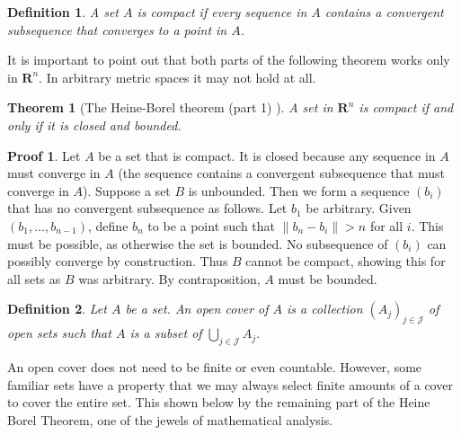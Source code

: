 \documentclass[12pt]{amsbook}
\theoremstyle{plain}
\newtheorem{definition}{Definition}
\newtheorem{theorem}{Theorem}
\theoremstyle{definition}
\newtheorem*{prf}{Proof}
\begin{document}
\begin{definition}
  A set $A$ is compact if every sequence in $A$ contains a convergent subsequence that converges to a point in $A$.
\end{definition}

It is important to point out that both parts of the following theorem works only in $\mathbf{R}^n$. In arbitrary metric spaces it may not hold at all.

\begin{theorem}[The Heine-Borel theorem (part 1) ]
  A set in $\mathbf{R}^n$ is compact if and only if it is closed and bounded.
\end{theorem}
\begin{prf}
  Let $A$ be a set that is compact. It is closed because any sequence in $A$ must converge in $A$ (the sequence contains a convergent subsequence that must converge in $A$). Suppose a set $B$ is unbounded. Then we form a sequence $(b_i)$ that has no convergent subsequence as follows. Let $b_1$ be arbitrary. Given $(b_1, \dots, b_{n-1})$, define $b_n$ to be a point such that $\| b_n - b_i \| > n$ for all $i$. This must be possible, as otherwise the set is bounded. No subsequence of $(b_i)$ can possibly converge by construction. Thus $B$ cannot be compact, showing this for all sets as $B$ was arbitrary. By contraposition, $A$ must be bounded.
\end{prf}

\begin{definition}
  Let $A$ be a set. An open cover of $A$ is a collection $(A_j)_{j \in \mathcal{J}}$ of open sets such that $A$ is a subset of $\bigcup_{j \in \mathcal{J}} A_j$.
\end{definition}

An open cover does not need to be finite or even countable. However, some familiar sets have a property that we may always select finite amounts of a cover to cover the entire set. This shown below by the remaining part of the Heine Borel Theorem, one of the jewels of mathematical analysis.
\end{document}

